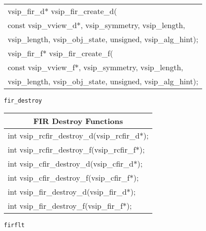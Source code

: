 {\begin{tabular}[H]{|l|}
vsip\_fir\_d* vsip\_fir\_create\_d(\\*\hspace{.6cm}const vsip\_vview\_d*, vsip\_symmetry, vsip\_length,\\*\hspace{.6cm}vsip\_length, vsip\_obj\_state, unsigned, vsip\_alg\_hint);\\
vsip\_fir\_f* vsip\_fir\_create\_f(\\*\hspace{.6cm}const vsip\_vview\_f*, vsip\_symmetry, vsip\_length,\\*\hspace{.6cm}vsip\_length, vsip\_obj\_state, unsigned, vsip\_alg\_hint);\\\hline
\end{tabular}\vspace{.1cm}
}
\newline \hspace*{.8cm} \vspace*{.1cm} \texttt{fir\_destroy}
\newline \hspace*{1.cm} {
\ttfamily
\begin{tabular}[H]{|l|}
\hline \multicolumn{1}{c}{\rmfamily \bfseries FIR Destroy Functions\vspace{.1cm}}\\ \hline
int vsip\_rcfir\_destroy\_d(vsip\_rcfir\_d*);\\
int vsip\_rcfir\_destroy\_f(vsip\_rcfir\_f*);\\
int vsip\_cfir\_destroy\_d(vsip\_cfir\_d*);\\
int vsip\_cfir\_destroy\_f(vsip\_cfir\_f*);\\
int vsip\_fir\_destroy\_d(vsip\_fir\_d*);\\
int vsip\_fir\_destroy\_f(vsip\_fir\_f*);\\\hline
\end{tabular}\vspace{.1cm}
}\vspace{.1cm}
\newline \hspace*{.8cm} \vspace*{.1cm} \texttt{firflt}
